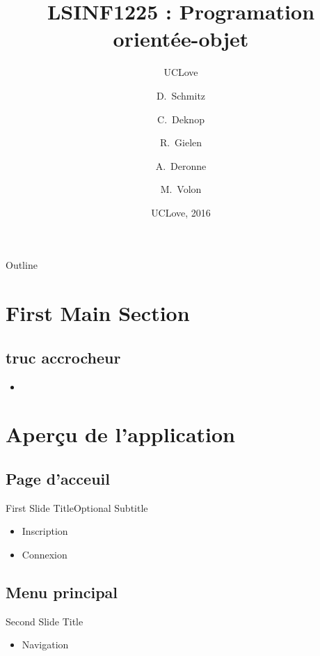\documentclass{beamer}
\title{LSINF1225 : Programation orientée-objet}
\subtitle{UCLove}
\author{D.~Schmitz\inst{1} \and C.~Deknop\inst{2} \and R.~Gielen\inst{3} \and A.~Deronne\inst{4} \and M.~Volon\inst{5}}
\institute[Université de Louvain-la-Neuve] %
{
  \inst{1}%
  SINF11BA
  \and
  \inst{2}%
  SINF12BA
  \and
  \inst{3}%
  SINF12BA
  \and
  \inst{4}%
  SINF12BA
  \and
  \inst{5}%
  LING2MS/LA
  }
\date{UCLove, 2016}
\begin{document}
\begin{frame}
  \titlepage
\end{frame}

\begin{frame}{Outline}
  \tableofcontents
\end{frame}

\section{First Main Section}

\subsection{truc accrocheur}

\begin{frame}
	\begin{itemize}
	
	\item{
	
	}
	\end{itemize}
\end{frame}
\section{Aperçu de l'application}

\subsection{Page d'acceuil}

\begin{frame}{First Slide Title}{Optional Subtitle}
  \begin{itemize}
  \item {
    Inscription
  }
  \item {
    Connexion
  }
  \end{itemize}
\end{frame}

\subsection{Menu principal}

\begin{frame}{Second Slide Title}
  \begin{itemize}
  \item {
	Navigation
  }
  \end{itemize}
\end{frame}
\end{document}
